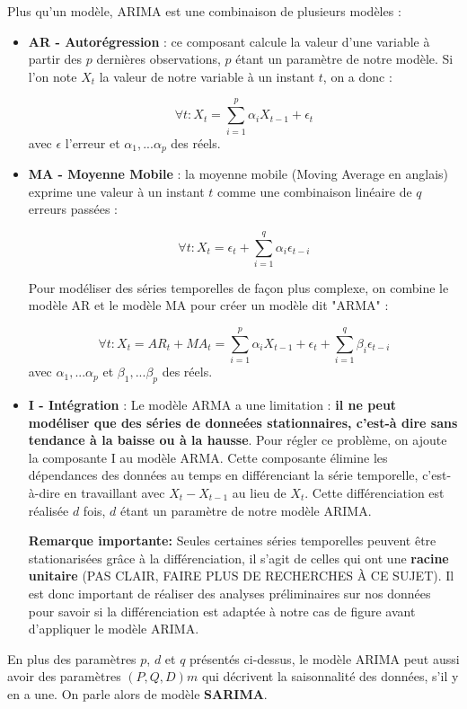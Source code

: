 \documentclass[french]{article}
\begin{document}
    Plus qu'un modèle, ARIMA est une combinaison de plusieurs modèles :
    \begin{itemize}
        \item \textbf{AR - Autorégression} : ce composant calcule la valeur d'une variable à partir des $p$ dernières observations, $p$ étant un paramètre de notre modèle. Si l'on note $X_t$ la valeur de notre variable à un instant $t$, on a donc :

        \begin{equation}\forall t : X_t = \sum_{i=1}^p \alpha_i X_{t-1} + \epsilon_t \end{equation}
        avec $\epsilon$ l'erreur et $\alpha_1,...\alpha_p$ des réels.
        \item \textbf{MA - Moyenne Mobile} : la moyenne mobile (Moving Average en anglais) exprime une valeur à un instant $t$ comme une combinaison linéaire de $q$ erreurs passées :

        \begin{equation}\forall t : X_t = \epsilon_t + \sum_{i=1}^q \alpha_i \epsilon_{t-i} \end{equation}

        Pour modéliser des séries temporelles de façon plus complexe, on combine le modèle AR et le modèle MA pour créer un modèle dit "ARMA" :

        \begin{equation}\forall t : X_t = AR_t + MA_t = \sum_{i=1}^p \alpha_i X_{t-1} + \epsilon_t + \sum_{i=1}^q \beta_i \epsilon_{t-i} \end{equation}
        avec $\alpha_1,...\alpha_p$ et $\beta_1,...\beta_p$ des réels.
        \item \textbf{I - Intégration} : Le modèle ARMA a une limitation : \textbf{il ne peut modéliser que des séries de donneées stationnaires, c'est-à dire sans tendance à la baisse ou à la hausse}. Pour régler ce problème, on ajoute la composante I au modèle ARMA.
        Cette composante élimine les dépendances des données au temps en différenciant la série temporelle, c'est-à-dire en travaillant avec $X_t - X_{t-1}$ au lieu de $X_t$. Cette différenciation est réalisée $d$ fois, $d$ étant un paramètre de notre modèle ARIMA.

        \textbf{Remarque importante: }Seules certaines séries temporelles peuvent être stationarisées grâce à la différenciation, il s'agit de celles qui ont une \textbf{racine unitaire} (PAS CLAIR, FAIRE PLUS DE RECHERCHES À CE SUJET). Il est donc important de réaliser des analyses préliminaires sur nos données pour savoir si la différenciation est adaptée à notre cas de figure avant d'appliquer le modèle ARIMA.

    \end{itemize}
    En plus des paramètres $p$, $d$ et $q$ présentés ci-dessus, le modèle ARIMA peut aussi avoir des paramètres $(P, Q, D)m$ qui décrivent la saisonnalité des données, s'il y en a une. On parle alors de modèle \textbf{SARIMA}.
    
\end{document}

